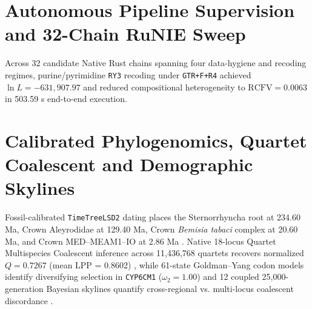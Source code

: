 \documentclass[10pt,letterpaper]{article}
\begin{document}
\section{Autonomous Pipeline Supervision and 32-Chain RuNIE Sweep}
Across 32 candidate Native Rust chains spanning four data-hygiene and recoding regimes, purine/pyrimidine \texttt{RY3} recoding under \texttt{GTR+F+R4} achieved $\ln L = -631,907.97$ and reduced compositional heterogeneity to $\mathrm{RCFV} = 0.0063$ in 503.59 s end-to-end execution.
\section{Calibrated Phylogenomics, Quartet Coalescent and Demographic Skylines}
Fossil-calibrated \texttt{TimeTreeLSD2} dating places the Sternorrhyncha root at 234.60 Ma, Crown Aleyrodidae at 129.40 Ma, Crown \textit{Bemisia tabaci} complex at 20.60 Ma, and Crown MED--MEAM1--IO at 2.86 Ma \cite{ref2,ref3,ref4}. Native 18-locus Quartet Multispecies Coalescent inference across 11,436,768 quartets recovers normalized $Q = 0.7267$ (mean LPP = 0.8602) \cite{ref17}, while 61-state Goldman--Yang codon models identify diversifying selection in \texttt{CYP6CM1} ($\omega_2 = 1.00$) \cite{ref16,ref19} and 12 coupled 25,000-generation Bayesian skylines quantify cross-regional vs. multi-locus coalescent discordance \cite{ref18}.
\end{document}
